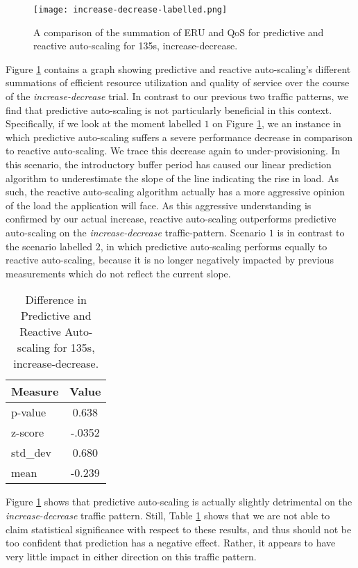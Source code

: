 \begin{figure}[!h]
  \centerline{\texttt{[image: increase-decrease-labelled.png]}}
  \caption{A comparison of the summation of ERU and QoS for
    predictive and reactive auto-scaling for 135s, increase-decrease.}
  \label{fig:135s-increase-decrease-labelled}
\end{figure}

Figure \ref{fig:135s-increase-decrease-labelled} contains a graph
showing predictive and reactive auto-scaling's different
summations of efficient resource utilization and quality of service over the
course of the \textit{increase-decrease} trial. In contrast to our previous two
traffic patterns, we find that predictive auto-scaling is not particularly
beneficial in this context. Specifically, if we look at the moment labelled
$1$ on Figure \ref{fig:135s-increase-decrease-labelled}, we an instance in which
predictive auto-scaling suffers a severe performance decrease in comparison to
reactive auto-scaling. We trace this decrease again to under-provisioning. In
this scenario, the introductory buffer period has caused our linear prediction
algorithm to underestimate the slope of the line indicating the rise in load. As
such, the reactive auto-scaling algorithm actually has a more aggressive opinion
of the load the application will face. As this aggressive understanding is
confirmed by our actual increase, reactive auto-scaling outperforms predictive
auto-scaling on the \textit{increase-decrease} traffic-pattern. Scenario
$1$ is in contrast to the scenario labelled $2$, in which predictive
auto-scaling performs equally to reactive auto-scaling, because it is no longer
negatively impacted by previous measurements which do not reflect the current
slope.

\begin{table}[htbp]
  \centering
  \caption{Difference in Predictive and Reactive Auto-scaling for 135s,
  increase-decrease.}
  \label{tab:135s-increase-decrease}
\begin{tabular}{l c}\hline\hline
    \multicolumn{1}{c}{\textbf{Measure}} & \textbf{Value} \\ \hline
     p-value & 0.638 \\
     z-score & -.0352 \\
     std\_dev & 0.680 \\
     mean & -0.239
  \end{tabular}
\end{table}

Figure \ref{fig:135s-increase-decrease-labelled} shows that predictive
auto-scaling is actually slightly detrimental on
the \textit{increase-decrease} traffic pattern.
Still, Table \ref{tab:135s-increase-decrease} shows that we are not able to claim
statistical significance with respect to these results, and thus should not be
too confident that prediction has a negative effect. Rather, it appears to
have very little impact in either direction on this traffic pattern.
